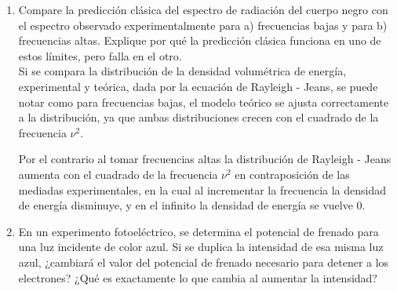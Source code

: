 \documentclass[12pt,a4paper]{article}
\begin{document}
\begin{enumerate}
donde un cuanto es $ E_{0} = h\nu $, con esto en mente podemos diseñar una especie de cuanto para la energía potencial del elevador.\\

La energía potencial del elevador es,

\[
U = mgh,
\]

si consideramos a $ m $ como constante y a $ h $ como la minima altura o una altura fija, entonces la energía potencial cuantizada es,

\[
U = n m g h,
\]

esto implica que solo las configuraciones de masa-altura que sean múltiplos del cuanto mínimo, serán validas, por lo que el elevador no puede tener cualquier masa ni cualquier altura.

\item Compare la predicción clásica del espectro de radiación del cuerpo negro con el espectro observado experimentalmente para a) frecuencias bajas y para b) frecuencias altas. Explique por qué la predicción clásica funciona en uno de estos límites, pero falla en el otro.\\

Si se compara la distribución de la densidad volumétrica de energía, experimental y teórica, dada por la ecuación de Rayleigh - Jeans, se puede notar como para frecuencias bajas, el modelo teórico se ajusta correctamente a la distribución, ya que ambas distribuciones crecen con el cuadrado de la frecuencia $\nu^2$.

Por el contrario al tomar frecuencias altas la distribución de Rayleigh - Jeans aumenta con el cuadrado de la frecuencia $\nu^2$ en contraposición de las mediadas experimentales, en la cual al incrementar la frecuencia la densidad de energía disminuye, y en el infinito la densidad de energía se vuelve 0.


\begin{center}
\end{center}

\item En un experimento fotoeléctrico, se determina el potencial de frenado para una luz incidente de color azul. Si se duplica la intensidad de esa misma luz azul, ¿cambiará el valor del potencial de frenado necesario para detener a los electrones? ¿Qué es exactamente lo que cambia al aumentar la intensidad?


\end{enumerate}
\end{document}
